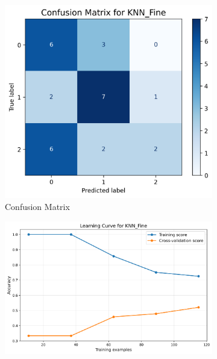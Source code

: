 \documentclass[10pt]{article}
\begin{document}
    \begin{figure}[!ht]
        \begin{subfigure}{0.33\textwidth}
            \centering
            \includegraphics[width=\textwidth]{code/ResultsMainAugZip/plots/Block2_KNN_Variants_Experiment_II/confusion_matrix_KNN_Fine.png}
            \caption{Confusion Matrix}
        \end{subfigure}
        \begin{subfigure}{0.33\textwidth}
            \centering
            \includegraphics[width=\textwidth]{code/ResultsMainAugZip/plots/Block2_KNN_Variants_Experiment_II/learning_curve_KNN_Fine.png}

\end{subfigure}
\end{figure}
\end{document}
